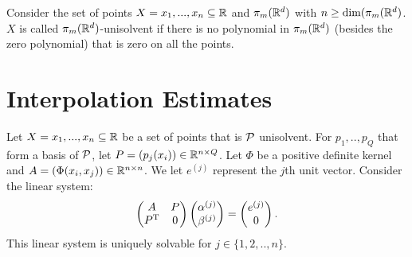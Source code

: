 \documentclass[twoside]{memoir}
\begin{document}
\begin{defn}
	Consider the set of points $X = {x_1, ..., x_n} \subseteq \mathbb{R}$ and $\pi_m(\mathbb{R}^d)$ with $n \geq \dim(\pi_m(\mathbb{R}^d)$. $X$ is called $\pi_m(\mathbb{R}^d)$-unisolvent if there is no polynomial in $\pi_m(\mathbb{R}^d)$ (besides the zero polynomial) that is zero on all the points.
\end{defn}


\section{Interpolation Estimates}

Let $X = {x_1, ..., x_n} \subseteq \mathbb{R}$  be a set of points that is $\mathcal{P}$ unisolvent. For $p_1, .., p_Q$ that form a basis of $\mathcal{P}$, let $P = (p_j(x_i)) \in \mathbb{R}^{n\times Q}$. Let $\Phi$ be a positive definite kernel and $A = (\Phi(x_i, x_j)) \in \mathbb{R}^{n\times n}$. We let $e^{(j)}$ represent the $j$th unit vector.
Consider the linear system:
\begin{equation} \label{eqn:InterpolateMat}
\begin{pmatrix}
A & P \\
P^{\text{T}} & 0 \\
\end{pmatrix}
\begin{pmatrix}
\alpha^{(j)} \\ \beta^{(j)}
\end{pmatrix}
=
\begin{pmatrix}
e^{(j)} \\ 0
\end{pmatrix}.
\end{equation}
This linear system is uniquely solvable for $j \in \{1, 2, .., n\}$.
\end{document}
